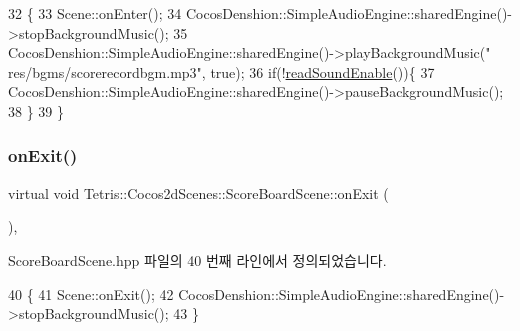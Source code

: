 \begin{DoxyCode}
32                                   \{
33                 Scene::onEnter();
34                 CocosDenshion::SimpleAudioEngine::sharedEngine()->stopBackgroundMusic();
35                 CocosDenshion::SimpleAudioEngine::sharedEngine()->playBackgroundMusic(\textcolor{stringliteral}{"
      res/bgms/scorerecordbgm.mp3"}, \textcolor{keyword}{true});
36                 \textcolor{keywordflow}{if}(!\hyperlink{class_tetris_1_1_cocos2d_scenes_1_1_score_board_scene_a451d25787dec38631575bc240b86c897}{readSoundEnable}())\{
37                     CocosDenshion::SimpleAudioEngine::sharedEngine()->pauseBackgroundMusic();
38                 \}
39             \}
\end{DoxyCode}
\mbox{\label{class_tetris_1_1_cocos2d_scenes_1_1_score_board_scene_ade9d785bcda22a7d410c316909377ff8}} 
\subsubsection{\texorpdfstring{on\+Exit()}{onExit()}}
{\footnotesize\ttfamily virtual void Tetris\+::\+Cocos2d\+Scenes\+::\+Score\+Board\+Scene\+::on\+Exit (\begin{DoxyParamCaption}{ }\end{DoxyParamCaption})\hspace{0.3cm}{\ttfamily [inline]}, {\ttfamily [virtual]}}



Score\+Board\+Scene.\+hpp 파일의 40 번째 라인에서 정의되었습니다.


\begin{DoxyCode}
40                                  \{
41                 Scene::onExit();
42                 CocosDenshion::SimpleAudioEngine::sharedEngine()->stopBackgroundMusic();
43             \}
\end{DoxyCode}
\mbox{\label{class_tetris_1_1_cocos2d_scenes_1_1_score_board_scene_a451d25787dec38631575bc240b86c897}} 
